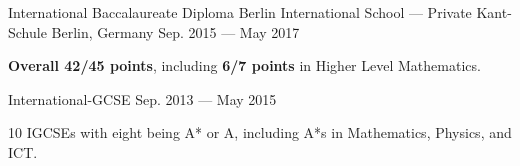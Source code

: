 \begin{cventries}
    \cventry
    {International Baccalaureate Diploma} %
    {Berlin International School --- Private Kant-Schule} %
    {Berlin, Germany} %
    {Sep. 2015 --- May 2017} %
    {
        \begin{cvitems} %
            \item {\textbf{Overall 42/45 points}, including \textbf{6/7 points} in Higher Level Mathematics.
            }
        \end{cvitems}
    }

    \cventry
    {International-GCSE} %
    {} %
    {} %
    {Sep. 2013 --- May 2015} %
    {
        \begin{cvitems} %
            \item {10 IGCSEs with eight being A* or A, including A*s in Mathematics, Physics, and ICT.}
        \end{cvitems}
    }

\end{cventries}
